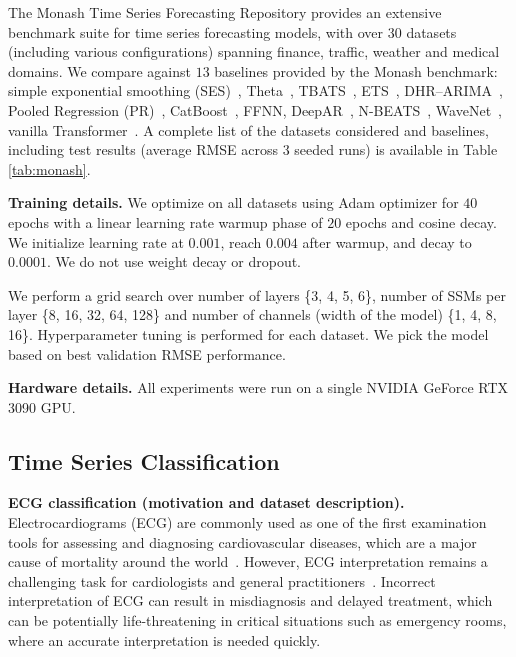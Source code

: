 The Monash Time Series Forecasting Repository \citep{godahewa2021monash} provides an extensive benchmark suite for time series forecasting models, with over $30$ datasets (including various configurations) spanning finance, traffic, weather and medical domains. We compare \ourmethod{} against $13$ baselines provided by the Monash benchmark: simple exponential smoothing (SES)~\citep{gardner1985exponential}, Theta~\citep{assimakopoulos2000theta}, TBATS~\citep{de2011forecasting}, ETS~\citep{winters1960forecasting}, DHR--ARIMA~\citep{hyndman2018forecasting}, Pooled Regression (PR)~\citep{trapero2015identification}, CatBoost~\citep{dorogush2018catboost}, FFNN, DeepAR~\citep{salinas2020deepar}, N-BEATS~\cite{oreshkin2019n}, WaveNet~\citep{oord2016wavenet}, vanilla Transformer~\citep{vaswani2017attention}. A complete list of the datasets considered and baselines, including test results (average RMSE across $3$ seeded runs) is available in Table \ref{tab:monash}.

\textbf{Training details.}
%
We optimize \ourmethod{} on all datasets using Adam optimizer for $40$ epochs with a linear learning rate warmup phase of $20$ epochs and cosine decay. We initialize learning rate at $0.001$, reach $0.004$ after warmup, and decay to $0.0001$. We do not use weight decay or dropout.

We perform a grid search over number of layers \{3, 4, 5, 6\}, number of SSMs per layer \{8, 16, 32, 64, 128\} and number of channels (width of the model) \{1, 4, 8, 16\}. Hyperparameter tuning is performed for each dataset. We pick the model based on best validation RMSE performance.

\textbf{Hardware details.}
All experiments were run on a single NVIDIA GeForce RTX 3090 GPU.
%

\subsection{Time Series Classification} \label{app:classification_exps} 

\textbf{ECG classification (motivation and dataset description).} Electrocardiograms (ECG) are commonly used as one of the first examination tools for assessing and diagnosing cardiovascular diseases, which are a major cause of mortality around the world~\citep{amini2021trend}.
However, ECG interpretation remains a challenging task for cardiologists and general practitioners~\citep{jablonover2014ecgcompetency, cook2020accuracy}. 
Incorrect interpretation of ECG can result in misdiagnosis and delayed treatment, which can be potentially life-threatening in critical situations such as emergency rooms, where an accurate interpretation is needed quickly.

